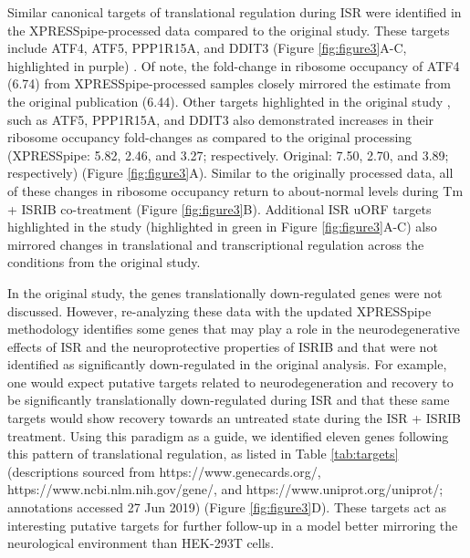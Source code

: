 \documentclass[11pt, a4paper, oneside]{article}
\begin{document}
Similar canonical targets of translational regulation during ISR were identified in the XPRESSpipe-processed data compared to the original study. These targets include ATF4, ATF5, PPP1R15A, and DDIT3 (Figure \ref{fig:figure3}A-C, highlighted in purple) \cite{isrib_riboseq}. Of note, the fold-change in ribosome occupancy of ATF4 (6.74) from XPRESSpipe-processed samples closely mirrored the estimate from the original publication (6.44). Other targets highlighted in the original study \cite{isrib_riboseq}, such as ATF5, PPP1R15A, and DDIT3 also demonstrated increases in their ribosome occupancy fold-changes as compared to the original processing (XPRESSpipe: 5.82, 2.46, and 3.27; respectively. Original: 7.50, 2.70, and 3.89; respectively) (Figure \ref{fig:figure3}A). Similar to the originally processed data, all of these changes in ribosome occupancy return to about-normal levels during Tm + ISRIB co-treatment (Figure \ref{fig:figure3}B). Additional ISR uORF targets highlighted in the study (highlighted in green in Figure \ref{fig:figure3}A-C) also mirrored changes in translational and transcriptional regulation across the conditions from the original study. \par

In the original study, the genes translationally down-regulated genes were not discussed. However, re-analyzing these data with the updated XPRESSpipe methodology identifies some genes that may play a role in the neurodegenerative effects of ISR and the neuroprotective properties of ISRIB and that were not identified as significantly down-regulated in the original analysis. For example, one would expect putative targets related to neurodegeneration and recovery to be significantly translationally down-regulated during ISR and that these same targets would show recovery towards an untreated state during the ISR + ISRIB treatment. Using this paradigm as a guide, we identified eleven genes following this pattern of translational regulation, as listed in Table \ref{tab:targets} (descriptions sourced from https://www.genecards.org/, https://www.ncbi.nlm.nih.gov/gene/, and https://www.uniprot.org/uniprot/; annotations accessed 27 Jun 2019) (Figure \ref{fig:figure3}D). These targets act as interesting putative targets for further follow-up in a model better mirroring the neurological environment than HEK-293T cells.
\end{document}
